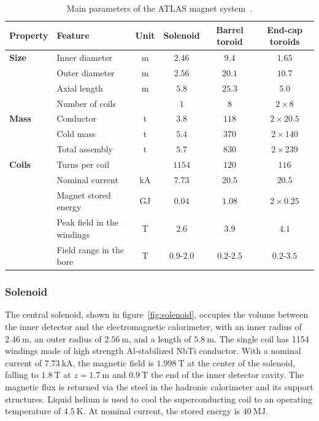 \begin{table}[htbp]
	\centering
	\scriptsize
	\begin{tabular}{|l|l|c|c|c|c|}
		\hline
		\textbf{Property} & \textbf{Feature} & \textbf{Unit} & \textbf{Solenoid} & \textbf{Barrel toroid} & \textbf{End-cap toroids} \\
		\hline
		\textbf{Size} & Inner diameter & m & $2.46$ & $9.4$ & $1.65$ \\
		\hline
		 & Outer diameter & m & $2.56$ & $20.1$ & $10.7$ \\
		\hline
		 & Axial length & m & $5.8$ & $25.3$ & $5.0$ \\
		\hline
		 & Number of coils & & $1$ & $8$ & $2\times 8$ \\
		\hline
		\textbf{Mass} & Conductor & t & $3.8$ & $118$ & $2\times 20.5$ \\
		\hline
		 & Cold mass & t & $5.4$ & $370$ & $2\times 140$ \\
		\hline
		 & Total assembly & t & $5.7$ & $830$ & $2\times 239$ \\
		\hline
		\textbf{Coils} & Turns per coil & & $1154$ & $120$ & $116$ \\
		\hline
		 & Nominal current & kA & $7.73$ & $20.5$ & $20.5$ \\
		\hline
		 & Magnet stored energy & GJ & $0.04$ & $1.08$ & $2\times 0.25$ \\
		\hline
		 & Peak field in the windings & T & $2.6$ & $3.9$ & $4.1$ \\
		\hline
		 & Field range in the bore & T & $0.9$-$2.0$ & $0.2$-$2.5$ & $0.2$-$3.5$ \\
		\hline
	\end{tabular}
	\caption[Main parameters of the ATLAS magnet system.]{Main parameters of the ATLAS magnet system~\cite{TheATLASCollaboration:2008fg}.}
	\label{table:ATLAS-magnet-parameters}
\end{table}




\subsubsection{Solenoid}\label{sec:ATLAS-magnets-solenoid}

The central solenoid, shown in figure~\ref{fig:solenoid}, occupies the volume between the inner detector and the electromagnetic calorimeter, with an inner radius of $\SI{2.46}{\meter}$, an outer radius of $\SI{2.56}{\meter}$, and a length of $\SI{5.8}{\meter}$. The single coil has 1154 windings made of high strength Al-stabilized NbTi conductor. With a nominal current of $\SI{7.73}{\kilo\ampere}$, the magnetic field is $\SI{1.998}{\tesla}$ at the center of the solenoid, falling to $\SI{1.8}{\tesla}$ at $z=\SI{1.7}{\meter}$ and $\SI{0.9}{\tesla}$ the end of the inner detector cavity.  The magnetic flux is returned via the steel in the hadronic calorimeter and its support structures. Liquid helium is used to cool the superconducting coil to an operating temperature of $\SI{4.5}{\kelvin}$. At nominal current, the stored energy is $\SI{40}{\mega\joule}$. 


